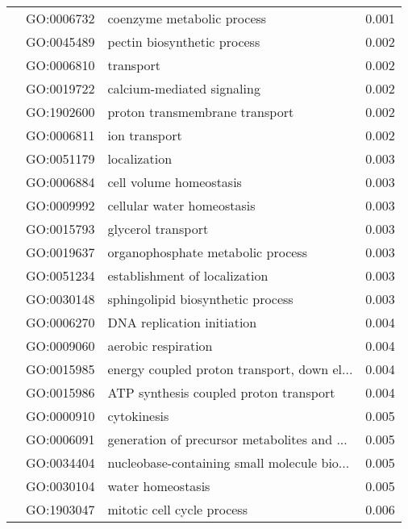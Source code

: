 \begin{longtable}{lllr}
   & GO:0006732 &                   coenzyme metabolic process &         0.001 \\
   & GO:0045489 &                  pectin biosynthetic process &         0.002 \\
   & GO:0006810 &                                    transport &         0.002 \\
   & GO:0019722 &                   calcium-mediated signaling &         0.002 \\
   & GO:1902600 &               proton transmembrane transport &         0.002 \\
   & GO:0006811 &                                ion transport &         0.002 \\
   & GO:0051179 &                                 localization &         0.003 \\
   & GO:0006884 &                      cell volume homeostasis &         0.003 \\
   & GO:0009992 &                   cellular water homeostasis &         0.003 \\
   & GO:0015793 &                           glycerol transport &         0.003 \\
   & GO:0019637 &            organophosphate metabolic process &         0.003 \\
   & GO:0051234 &                establishment of localization &         0.003 \\
   & GO:0030148 &            sphingolipid biosynthetic process &         0.003 \\
   & GO:0006270 &                   DNA replication initiation &         0.004 \\
   & GO:0009060 &                          aerobic respiration &         0.004 \\
   & GO:0015985 &  energy coupled proton transport, down el... &         0.004 \\
   & GO:0015986 &       ATP synthesis coupled proton transport &         0.004 \\
   & GO:0000910 &                                  cytokinesis &         0.005 \\
   & GO:0006091 &  generation of precursor metabolites and ... &         0.005 \\
   & GO:0034404 &  nucleobase-containing small molecule bio... &         0.005 \\
   & GO:0030104 &                            water homeostasis &         0.005 \\
   & GO:1903047 &                   mitotic cell cycle process &         0.006 \\

\end{longtable}
